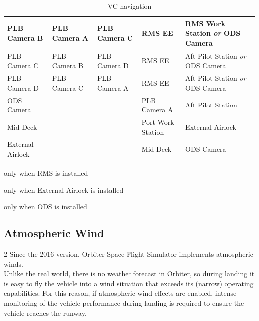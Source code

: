 \documentclass[Space_Shuttle_Vessel_Manual.tex]{subfiles}
\begin{document}
\begin{table}[H]
\begin{threeparttable}
\begin{tabular}{l|p{2.88cm} p{2.88cm} p{2.88cm} p{2.88cm} }
	\hline\rule{0pt}{2ex}
	PLB Camera B & PLB Camera A & PLB Camera C & RMS EE\tnote{a,c} & RMS Work Station \textit{or} ODS Camera\tnote{c}\\
	\hline\rule{0pt}{2ex}
	PLB Camera C & PLB Camera B & PLB Camera D & RMS EE\tnote{a,c} & Aft Pilot Station \textit{or} ODS Camera\tnote{c}\\
	\hline\rule{0pt}{2ex}
	PLB Camera D & PLB Camera C & PLB Camera A & RMS EE\tnote{a,c} & Aft Pilot Station \textit{or} ODS Camera\tnote{c}\\
	\hline\rule{0pt}{2ex}
	ODS Camera\tnote{c} & - & - & PLB Camera A & Aft Pilot Station\\
	\hline\rule{0pt}{2ex}
	Mid Deck & - & - & Port Work Station & External Airlock\tnote{b}\\
	\hline\rule{0pt}{2ex}
	External Airlock\tnote{b} & - & - & Mid Deck & ODS Camera\tnote{c}\\
  \end{tabular}
	\begin{tablenotes}
		\item[a] only when RMS is installed
		\item[b] only when External Airlock is installed
		\item[c] only when ODS is installed
	\end{tablenotes}
	\end{threeparttable}
  \caption{VC navigation}
  \label{tab:VC_navigation}
\end{table}
\newpage


\subsection{Atmospheric Wind}
\begin{multicols*}{2}
\noindent
Since the 2016 version, Orbiter Space Flight Simulator implements atmospheric winds.\\
Unlike the real world, there is no weather forecast in Orbiter, so during landing it is easy to fly the vehicle into a wind situation that exceeds its (narrow) operating capabilities. For this reason, if atmospheric wind effects are enabled, intense monitoring of the vehicle performance during landing is required to ensure the vehicle reaches the runway.\\
\end{multicols*}
\newpage


\end{document}
